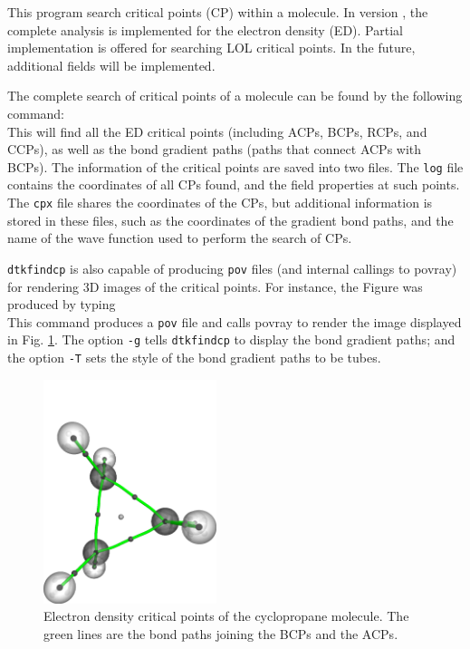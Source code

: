 This program search critical points (CP) within a molecule. In version \dtkversion, the complete analysis is implemented for the electron density (ED). Partial implementation is offered for searching LOL critical points. In the future, additional fields will be implemented.

The complete search of critical points of a molecule can be found by the following command:\\
This will find all the ED critical points (including ACPs, BCPs, RCPs, and CCPs), as well as the bond gradient paths (paths that connect ACPs with BCPs). The information of the critical points are saved into two files. The \texttt{log} file contains the coordinates of all CPs found, and the field properties at such points. The \texttt{cpx} file shares the coordinates of the CPs, but additional information is stored in these files, such as the coordinates of the gradient bond paths, and the name of the wave function used to perform the search of CPs.

\texttt{dtkfindcp} is also capable of producing \texttt{pov} files (and internal callings to povray) for rendering 3D images of the critical points. For instance, the Figure  was produced by typing\\
This command produces a \texttt{pov} file and calls povray to render the image displayed in Fig. \ref{fig:dtkfindcpusex}. The option \texttt{-g} tells \texttt{dtkfindcp} to display the bond gradient paths; and the option \texttt{-T} sets the style of the bond gradient paths to be tubes.
%
\begin{figure}[hb!]
\centering
\includegraphics[width=0.45\textwidth]{cyclopCPs}%
\caption{Electron density critical points of the cyclopropane molecule. The green lines are the bond paths joining the BCPs and the ACPs.}\label{fig:dtkfindcpusex}
\end{figure}
%

